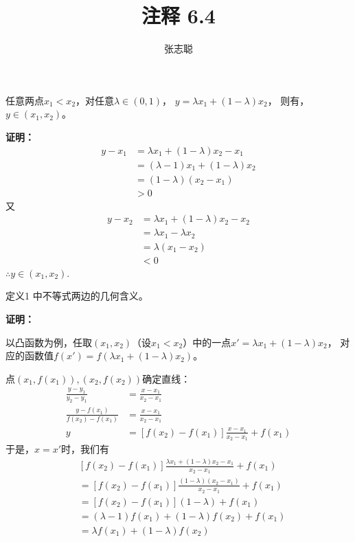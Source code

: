 \documentclass{article}
\begin{document}
\title{注释 6.4}
\author{张志聪}
\maketitle

\begin{zremark}
  任意两点$x_1 < x_2$，对任意$\lambda \in (0, 1)$，
  $y = \lambda x_1 + (1 - \lambda)x_2$，
  则有，$y \in (x_1, x_2)$。
\end{zremark}
\textbf{证明：}
\begin{align*}
  y - x_1
   & = \lambda x_1 + (1 - \lambda)x_2 - x_1  \\
   & = (\lambda - 1) x_1 + (1 - \lambda) x_2 \\
   & = (1 - \lambda) (x_2 - x_1)             \\
   & > 0
\end{align*}
又
\begin{align*}
  y - x_2
   & = \lambda x_1 + (1 - \lambda)x_2 - x_2 \\
   & = \lambda x_1 - \lambda x_2            \\
   & = \lambda (x_1 - x_2)                  \\
   & < 0
\end{align*}
$\therefore y \in (x_1, x_2)$.

\begin{zremark}
  定义1 中不等式两边的几何含义。
\end{zremark}
\textbf{证明：}

以凸函数为例，任取$(x_1, x_2)$（设$x_1 < x_2$）中的一点$x' = \lambda x_1 + (1 - \lambda)x_2$，
对应的函数值$f(x') = f(\lambda x_1 + (1 - \lambda)x_2)$。

点$(x_1, f(x_1)), (x_2, f(x_2))$确定直线：
\begin{align*}
  \frac{y - y_1}{y_2 - y_1}          & = \frac{x - x_1}{x_2 - x_1}                            \\
  \frac{y - f(x_1)}{f(x_2) - f(x_1)} & = \frac{x - x_1}{x_2 - x_1}                            \\
  y                                  & = [f(x_2) - f(x_1)] \frac{x - x_1}{x_2 - x_1} + f(x_1)
\end{align*}
于是，$x = x'$时，我们有
\begin{align*}
   & [f(x_2) - f(x_1)] \frac{\lambda x_1 + (1 - \lambda)x_2 - x_1}{x_2 - x_1} + f(x_1) \\
   & = [f(x_2) - f(x_1)] \frac{(1 - \lambda)(x_2 - x_1)}{x_2 - x_1} + f(x_1)           \\
   & = [f(x_2) - f(x_1)](1 - \lambda) + f(x_1)                                         \\
   & = (\lambda - 1)f(x_1) + (1 - \lambda)f(x_2) + f(x_1)                              \\
   & = \lambda f(x_1) + (1 - \lambda)f(x_2)
\end{align*}
\end{document}
